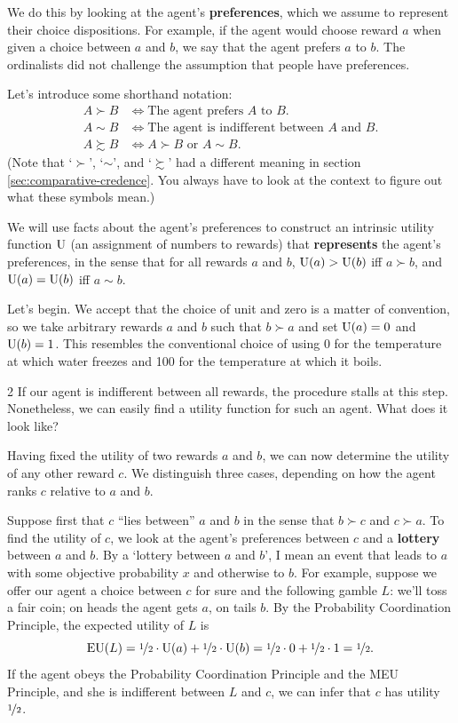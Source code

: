 We do this by looking at the agent's \textbf{preferences}, which we assume to
represent their choice dispositions. For example, if the agent would choose
reward $a$ when given a choice between $a$ and $b$, we say that the agent
prefers $a$ to $b$. The ordinalists did not challenge the assumption that people
have preferences.

Let's introduce some shorthand notation:
%
\begin{align*}
  A \succ B &\Leftrightarrow \text{The agent prefers $A$ to $B$}.\\
  A \sim B &\Leftrightarrow \text{The agent is indifferent between $A$ and $B$.}\\
  A \succsim B & \Leftrightarrow \text{$A \succ B$ or $A \sim B$.}
\end{align*}
%
(Note that `$\succ$', `$\sim$', and `$\succsim$' had a different meaning in
section \ref{sec:comparative-credence}. You always have to look at the context
to figure out what these symbols mean.)

We will use facts about the agent's preferences to construct an intrinsic
utility function $\text{U}$ (an assignment of numbers to rewards) that
\textbf{represents} the agent's preferences, in the sense that for all rewards
$a$ and $b$, $\text{U}(a) > \text{U}(b)$ iff $a \succ b$, and $\text{U}(a) = \text{U}(b)$ iff
$a \sim b$.

Let's begin. We accept that the choice of unit and zero is a matter of
convention, so we take arbitrary rewards $a$ and $b$ such that $b \succ a$ and
set $\text{U}(a) = 0$ and $\text{U}(b) = 1$. This resembles the conventional choice of using
0 for the temperature at which water freezes and 100 for the temperature at
which it boils.

\begin{exercise}{2}
  If our agent is indifferent between all rewards,  the procedure stalls at
  this step. Nonetheless, we can easily find a utility function for such an
  agent. What does it look like?
\end{exercise}

Having fixed the utility of two rewards $a$ and $b$, we can now determine the
utility of any other reward $c$. We distinguish three cases, depending on how
the agent ranks $c$ relative to $a$ and $b$.

Suppose first that $c$ ``lies between'' $a$ and $b$ in the sense that
$b \succ c$ and $c \succ a$. To find the utility of $c$, we look at the agent's
preferences between $c$ and a \textbf{lottery} between $a$ and $b$. By a
`lottery between $a$ and $b$', I mean an event that leads to $a$ with some
objective probability $x$ and otherwise to $b$. For example, suppose we offer
our agent a choice between $c$ for sure and the following gamble $L$: we'll toss
a fair coin; on heads the agent gets $a$, on tails $b$. By the Probability
Coordination Principle, the expected utility of $L$ is%
\[
  \text{EU}(L) = \nicefrac{1}{2} \cdot \text{U}(a) + \nicefrac{1}{2} \cdot \text{U}(b) =  
   \nicefrac{1}{2} \cdot 0 + \nicefrac{1}{2} \cdot 1 = \nicefrac{1}{2}. 
\]
If the agent obeys the Probability Coordination Principle and the MEU Principle,
and she is indifferent between $L$ and $c$, we can infer that 
$c$ has utility \(\nicefrac{1}{2}\).

